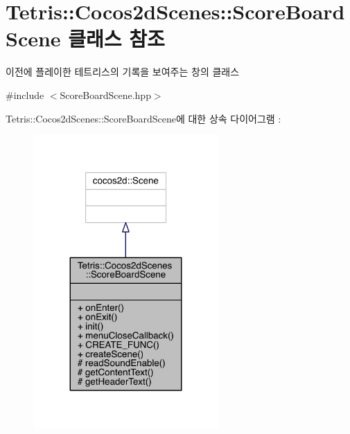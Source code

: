 \hypertarget{class_tetris_1_1_cocos2d_scenes_1_1_score_board_scene}{}\section{Tetris\+:\+:Cocos2d\+Scenes\+:\+:Score\+Board\+Scene 클래스 참조}
\label{class_tetris_1_1_cocos2d_scenes_1_1_score_board_scene}


이전에 플레이한 테트리스의 기록을 보여주는 창의 클래스  




{\ttfamily \#include $<$Score\+Board\+Scene.\+hpp$>$}



Tetris\+:\+:Cocos2d\+Scenes\+:\+:Score\+Board\+Scene에 대한 상속 다이어그램 \+: 
\nopagebreak
\begin{figure}[H]
\begin{center}
\leavevmode
\includegraphics[width=200pt]{class_tetris_1_1_cocos2d_scenes_1_1_score_board_scene__inherit__graph}
\end{center}
\end{figure}


